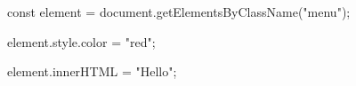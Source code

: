 const element = document.getElementsByClassName("menu");

element.style.color = "red";

element.innerHTML = "Hello";